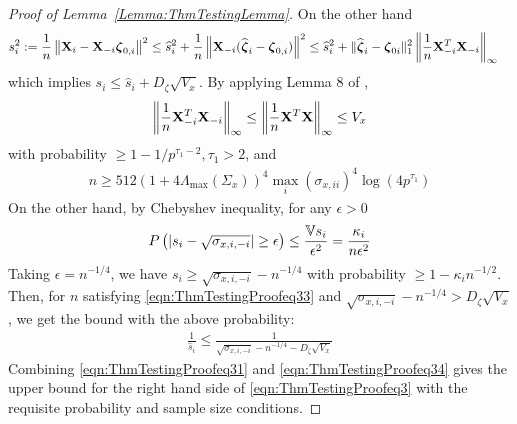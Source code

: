\begin{proof}[Proof of Lemma~\ref{Lemma:ThmTestingLemma}]
On the other hand
%
\begin{align*}
s_i^2 := \frac{1}{n} \left\| {\mathbf{X}}_i - {\mathbf{X}}_{-i}  {\boldsymbol{\zeta}}_{0,i} \right\|^2 & \leq 
\widehat s_i^2 + \frac{1}{n} \left\| {\mathbf{X}}_{-i} (\widehat {{\boldsymbol{\zeta}}}_i - {\boldsymbol{\zeta}}_{0,i} ) \right\|^2
\leq \widehat s_i^2 + \| \widehat {{\boldsymbol{\zeta}}}_i - {\boldsymbol{\zeta}}_{0i} \|_1^2 \left\| \frac{1}{n} {\mathbf{X}}_{-i}^T {\mathbf{X}}_{-i} \right\|_\infty
\end{align*}
%
which implies $s_i \leq \widehat s_i + D_\zeta \sqrt{ V_x}$. By applying Lemma 8 of \cite{RavikumarEtal11},
%
\begin{align}\label{eqn:ThmTestingProofeq32}
\left\| \frac{1}{n} {\mathbf{X}}_{-i}^T {\mathbf{X}}_{-i} \right\|_\infty \leq
\left\| \frac{1}{n} {\mathbf{X}}^T {\mathbf{X}} \right\|_\infty \leq V_x
\end{align}
%
with probability $ \geq 1 - 1/p^{\tau_1-2}, \tau_1>2$, and
%
\begin{align}\label{eqn:ThmTestingProofeq33}
n \geq 512 ( 1 + 4 \Lambda_{\max} (\Sigma_{x}))^4 \max_i (\sigma_{x,ii} )^4 \log (4p^{\tau_1})
\end{align}
%
On the other hand, by Chebyshev inequality, for any $\epsilon>0$
%
$$
P\left( | s_i - \sqrt{ \sigma_{x,i,-i}} | \geq \epsilon \right) \leq \frac{{\mathbb{V}} s_i}{\epsilon^2} =
\frac{\kappa_i}{n \epsilon^2}
$$
%
Taking $\epsilon = n^{-1/4}$, we have $s_i \geq \sqrt{ \sigma_{x,i,-i}} - n^{-1/4}$ with probability $\geq 1 - \kappa_i n^{-1/2}$. Then, for $n$ satisfying \eqref{eqn:ThmTestingProofeq33} and $\sqrt{ \sigma_{x,i,-i}} - n^{-1/4} >  D_\zeta \sqrt{ V_x} $, we get the bound with the above probability:
%
\begin{align}\label{eqn:ThmTestingProofeq34}
\frac{1}{\widehat s_i} \leq \frac{1}{\sqrt{ \sigma_{x,i,-i}} - n^{-1/4} - D_\zeta \sqrt{ V_x}}
\end{align}
%
Combining \eqref{eqn:ThmTestingProofeq31} and \eqref{eqn:ThmTestingProofeq34} gives the upper bound for the right hand side of \eqref{eqn:ThmTestingProofeq3} with the requisite probability and sample size conditions.


\end{proof}
